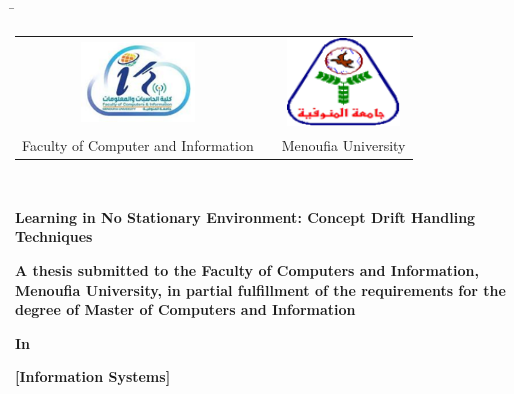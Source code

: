 

\begin{titlepage}
    \begin{tabbing}
        \hspace{1cm} %
        \= \kill %
        \begin{tabular}{ccc} %
          \includegraphics[width=3cm]{0_frontmatter/figures/PNG/faculty_image.png} & \hspace{2.5cm} & \includegraphics[width=3cm]{0_frontmatter/figures/PNG/menoufia_logo.png} \\
          \multicolumn{1}{l}{Faculty of Computer and Information} & \hspace{2.5cm}  & \multicolumn{1}{l}{Menoufia  University} \\
        \end{tabular}\\
    \end{tabbing}
    \begin{center}
        \vspace{0.5cm}

        \textbf{\Huge \normalfont Learning in No Stationary Environment: Concept Drift Handling Techniques} 
        \vspace{0.6cm}
        
        \textbf{\large \normalfont A thesis submitted to the Faculty of Computers and Information, Menoufia University, in partial fulfillment of the requirements for the degree of Master of Computers and Information} \\
        \vspace{0.4cm}
        
        \textbf{\large In} \\
        \vspace{0.3cm}
        
        \textbf{\Large [Information Systems]} \\
        \vspace{0.6cm}
        

\end{center}
\end{titlepage}
